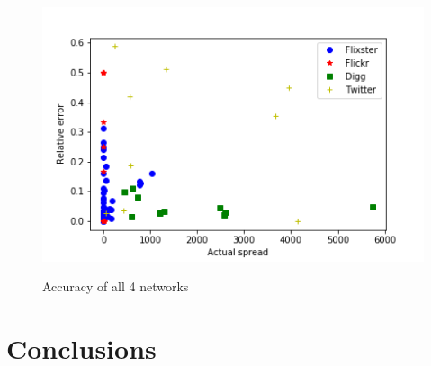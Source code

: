 \documentclass{acm_proc_article-sp}
\begin{document}
\begin{figure}[h]
	\includegraphics[width=\linewidth]{accuracy.png}
	\centering
	\label{accuracy}
    \caption{Accuracy of all 4 networks}
\end{figure}


\section{Conclusions}


%

%

\balancecolumns
\end{document}
